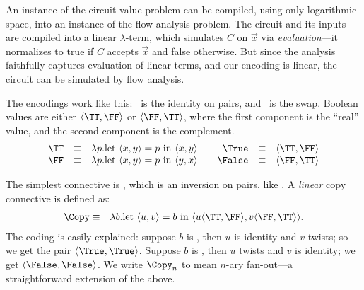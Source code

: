 An instance of the circuit value problem can be compiled, using only
logarithmic space, into an instance of the flow analysis problem.  The
circuit and its inputs are compiled into a linear $\lambda$-term,
which simulates $C$ on $\vec{x}$ via {\em evaluation}---it normalizes
to true if $C$ accepts $\vec{x}$ and false otherwise.  But since the
analysis faithfully captures evaluation of linear terms, and our
encoding is linear, the circuit can be simulated by flow analysis.

The encodings work like this: \TT\ is the identity on pairs, and \FF\
is the swap.  Boolean values are either $\langle\TT,\FF\rangle$ or
$\langle\FF,\TT\rangle$, where the first component is the ``real''
value, and the second component is the complement.  
\begin{displaymath}
\begin{array}{rcl@{\qquad}rcl}
\TT & \equiv & \lambda p . \mbox{let }\langle x,y \rangle = p\mbox{ in } \langle x, y\rangle &
\True & \equiv &\langle \TT,\FF \rangle\\
\FF & \equiv & \lambda p . \mbox{let }\langle x,y \rangle = p\mbox{ in } \langle y, x\rangle &
\False & \equiv &\langle \FF,\TT \rangle
\end{array}
\end{displaymath}

The simplest connective is \Not, which is an inversion on pairs, like
\FF.  A {\em linear} copy connective is defined as:
\begin{eqnarray*}
\Copy & \equiv & \lambda b.\mbox{let }\langle u,v\rangle = b\mbox{ in }
\langle u\langle \TT,\FF\rangle, v\langle \FF,\TT\rangle\rangle.
\end{eqnarray*}
The coding is easily explained: suppose $b$ is \True, then $u$ is
identity and $v$ twists; so we get the pair
$\langle\True,\True\rangle$.  Suppose $b$ is \False, then $u$ twists
and $v$ is identity; we get $\langle\False,\False\rangle$.  We write
$\Copy_n$ to mean $n$-ary fan-out---a straightforward extension of the
above.

